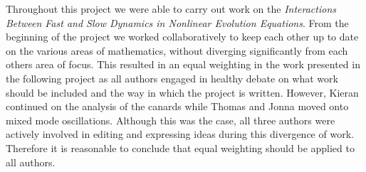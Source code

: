 Throughout this project we were able to carry out work on the \textit{Interactions Between Fast and Slow Dynamics in Nonlinear Evolution Equations}. From the beginning of the project we worked collaboratively to keep each other up to date on the various areas of mathematics, without diverging significantly from each others area of focus. This resulted in an equal weighting in the work presented in the following project as all authors engaged in healthy debate on what work should be included and the way in which the project is written. However, Kieran continued on the analysis of the canards while Thomas and Jonna moved onto mixed mode oscillations. Although this was the case, all three authors were actively involved in editing and expressing ideas during this divergence of work. Therefore it is reasonable to conclude that equal weighting should be applied to all authors.

